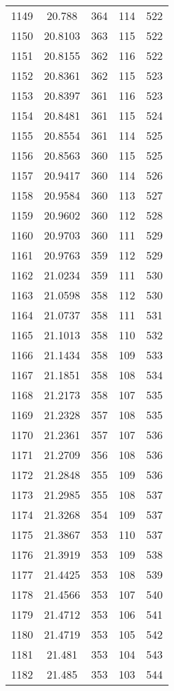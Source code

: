 \documentclass[12pt,a4paper]{article}
\begin{document}
\begin{tabular}{r|cccc}
	1149 & 20.788 & 364 & 114 & 522 \\
	1150 & 20.8103 & 363 & 115 & 522 \\
	1151 & 20.8155 & 362 & 116 & 522 \\
	1152 & 20.8361 & 362 & 115 & 523 \\
	1153 & 20.8397 & 361 & 116 & 523 \\
	1154 & 20.8481 & 361 & 115 & 524 \\
	1155 & 20.8554 & 361 & 114 & 525 \\
	1156 & 20.8563 & 360 & 115 & 525 \\
	1157 & 20.9417 & 360 & 114 & 526 \\
	1158 & 20.9584 & 360 & 113 & 527 \\
	1159 & 20.9602 & 360 & 112 & 528 \\
	1160 & 20.9703 & 360 & 111 & 529 \\
	1161 & 20.9763 & 359 & 112 & 529 \\
	1162 & 21.0234 & 359 & 111 & 530 \\
	1163 & 21.0598 & 358 & 112 & 530 \\
	1164 & 21.0737 & 358 & 111 & 531 \\
	1165 & 21.1013 & 358 & 110 & 532 \\
	1166 & 21.1434 & 358 & 109 & 533 \\
	1167 & 21.1851 & 358 & 108 & 534 \\
	1168 & 21.2173 & 358 & 107 & 535 \\
	1169 & 21.2328 & 357 & 108 & 535 \\
	1170 & 21.2361 & 357 & 107 & 536 \\
	1171 & 21.2709 & 356 & 108 & 536 \\
	1172 & 21.2848 & 355 & 109 & 536 \\
	1173 & 21.2985 & 355 & 108 & 537 \\
	1174 & 21.3268 & 354 & 109 & 537 \\
	1175 & 21.3867 & 353 & 110 & 537 \\
	1176 & 21.3919 & 353 & 109 & 538 \\
	1177 & 21.4425 & 353 & 108 & 539 \\
	1178 & 21.4566 & 353 & 107 & 540 \\
	1179 & 21.4712 & 353 & 106 & 541 \\
	1180 & 21.4719 & 353 & 105 & 542 \\
	1181 & 21.481 & 353 & 104 & 543 \\
	1182 & 21.485 & 353 & 103 & 544 \\

\end{tabular}
\end{document}
